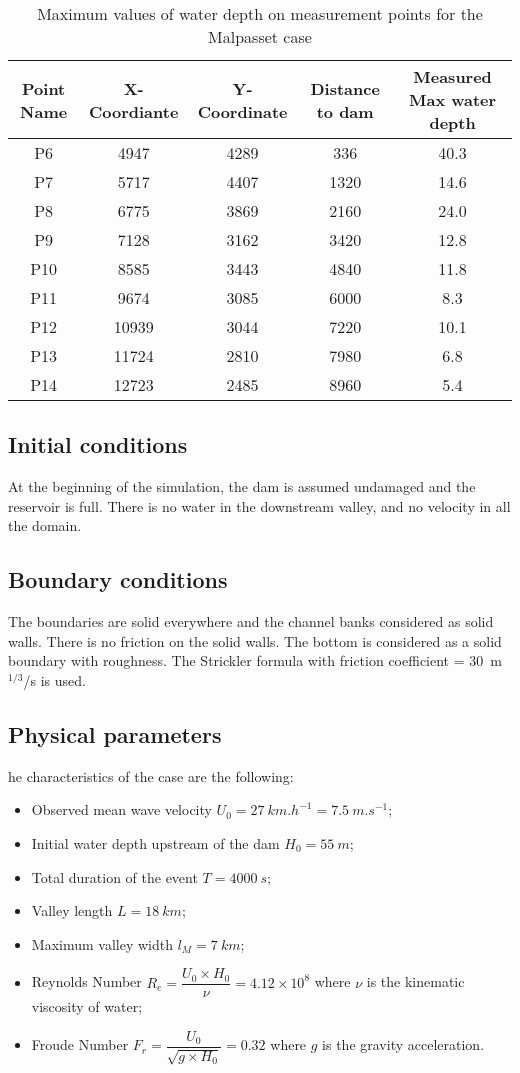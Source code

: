 \begin{table}[H]
  \centering
  \begin{tabular}{|c|c|c|c|c|}
    \hline Point Name & X-Coordiante & Y-Coordinate & Distance to dam & Measured Max water depth \\
    \hline P6 & 4947 & 4289 & 336 & 40.3\\
    P7 & 5717 & 4407 & 1320 & 14.6\\
    P8 & 6775 & 3869 & 2160 & 24.0\\
    P9 & 7128 & 3162 & 3420 & 12.8\\
    P10 & 8585 & 3443 & 4840 & 11.8 \\
    P11 & 9674 & 3085 & 6000 & 8.3\\
    P12 & 10939 & 3044 & 7220 & 10.1\\
    P13 & 11724 & 2810 & 7980 & 6.8 \\
    P14 & 12723 & 2485 & 8960 & 5.4\\
    \hline
  \end{tabular}
  \caption{Maximum values of water depth on measurement points for the Malpasset case}
  \label{tab:malpasset:MaxMeasures}
\end{table}

\subsection{Initial conditions}
At the beginning of the simulation, the dam is assumed undamaged and the reservoir is full. There is no water in the downstream valley, and no velocity in all the domain.
\subsection{Boundary conditions}
The boundaries are solid everywhere and the channel banks considered as solid walls. There is no friction on the solid walls. The bottom is considered as a solid boundary with roughness. The Strickler formula with friction coefficient = 30~m$^{1/3}$/s is used.

\subsection{Physical parameters}

he characteristics of the case are the following:
\begin{itemize}
  \itemsep0em
\item Observed mean wave velocity $U_0 = 27~km.h^{-1} = 7.5~m.s^{-1}$;
\item Initial water depth upstream of the dam $H_0 = 55~m$;
\item Total duration of the event $T = 4000~s$;
\item Valley length $L = 18~km$;
\item Maximum valley width $l_M = 7~km$;
\item Reynolds Number \textbf{$R_e = \dfrac{U_0 \times H_0}{\nu} =  4.12 \times 10^8$} where $\nu$ is the kinematic viscosity of water;
\item Froude Number \textbf{$F_r = \dfrac{U_0}{\sqrt{g \times H_0}} = 0.32$} where $g$ is the gravity acceleration.
\end{itemize}

